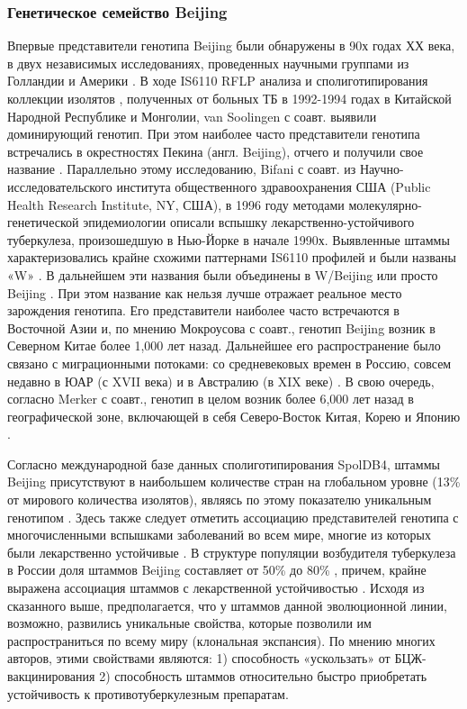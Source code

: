 \subsubsection{Генетическое семейство Beijing}
Впервые представители генотипа Beijing были обнаружены в 90х годах ХХ века, в двух независимых исследованиях, проведенных научными группами из Голландии и Америки \cite{van1995predominance, bifani1996origin}. В ходе IS6110 RFLP анализа и сполиготипирования коллекции изолятов , полученных от больных ТБ в 1992-1994 годах в Китайской Народной Республике и Монголии, van Soolingen с соавт. выявили доминирующий генотип. При этом наиболее часто представители генотипа встречались в окрестностях Пекина (англ. Beijing), отчего и получили свое название \cite{van1995predominance}. Параллельно этому исследованию, Bifani с соавт. из Научно-исследовательского института общественного здравоохранения США (Public Health Research Institute, NY, США), в 1996 году методами молекулярно-генетической эпидемиологии описали вспышку лекарственно-устойчивого туберкулеза, произошедшую в Нью-Йорке в начале 1990х. Выявленные штаммы характеризовались крайне схожими паттернами IS6110 профилей и были названы «W» \cite{bifani1996origin}. В дальнейшем эти названия были объединены в W/Beijing или просто Beijing \cite{van2001molecular, kurepina1998characterization}. При этом название как нельзя лучше отражает реальное место зарождения генотипа. Его представители наиболее часто встречаются в Восточной Азии и, по мнению Мокроусова с соавт., генотип Beijing возник в Северном Китае более 1,000 лет назад. Дальнейшее его распространение было связано с миграционными потоками: со средневековых времен в Россию, совсем недавно в ЮАР (с XVII века) и в Австралию (в XIX веке) \cite{mokrousov2008molecular}. В свою очередь, согласно Merker с соавт., генотип в целом возник более 6,000 лет назад в географической зоне, включающей в себя Северо-Восток Китая, Корею и Японию \cite{merker2015evolutionary}.

Согласно международной базе данных сполиготипирования SpolDB4, штаммы Beijing присутствуют в наибольшем количестве стран на глобальном уровне (13\% от мирового количества изолятов), являясь по этому показателю уникальным генотипом \cite{brudey2006mycobacterium}. Здесь также следует отметить ассоциацию представителей генотипа с многочисленными вспышками заболеваний во всем мире, многие из которых были лекарственно устойчивые \cite{frieden1996multi, agerton1999spread, affolabi2009first, caminero2001epidemiological}. В структуре популяции возбудителя туберкулеза в России доля штаммов Beijing составляет от 50\% до 80\% \cite{mokrousov2003pcr}, причем, крайне выражена ассоциация штаммов с лекарственной устойчивостью \cite{casali2014evolution}. Исходя из сказанного выше, предполагается, что у штаммов данной эволюционной линии, возможно, развились уникальные свойства, которые позволили им распространиться по всему миру (клональная экспансия). По мнению многих авторов, этими свойствами являются: 1) способность «ускользать» от БЦЖ-вакцинирования 2) способность штаммов относительно быстро приобретать устойчивость к противотуберкулезным препаратам.


